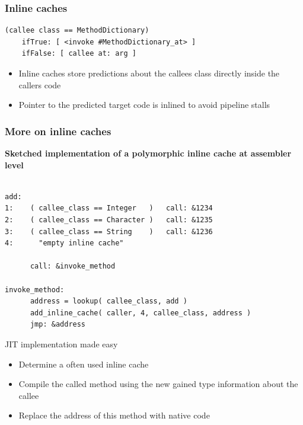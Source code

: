 \documentclass{beamer}
\begin{document}
\begin{frame}[fragile]
    \frametitle{Inline caches}

    \begin{lstlisting}
(callee class == MethodDictionary)
    ifTrue: [ <invoke #MethodDictionary_at> ]
    ifFalse: [ callee at: arg ]
    \end{lstlisting}

    \begin{itemize}
        \item Inline caches store predictions about the callees class directly inside the callers code
        \item Pointer to the predicted target code is inlined to avoid pipeline stalls
    \end{itemize}
\end{frame}

\lstset{language=C}

\begin{frame}[fragile]
    \frametitle{More on inline caches}

    {\bf Sketched implementation of a polymorphic inline cache at assembler level}

    \begin{lstlisting}

add:
1:    ( callee_class == Integer   )   call: &1234
2:    ( callee_class == Character )   call: &1235
3:    ( callee_class == String    )   call: &1236
4:      "empty inline cache"

      call: &invoke_method

invoke_method:
      address = lookup( callee_class, add )
      add_inline_cache( caller, 4, callee_class, address )
      jmp: &address

    \end{lstlisting}

\end{frame}

\begin{frame}{JIT implementation made easy}
        \begin{itemize}
            \item Determine a often used inline cache
            \item Compile the called method using the new gained type information about the callee
            \item Replace the address of this method with native code
        \end{itemize}
\end{frame}
\end{document}
